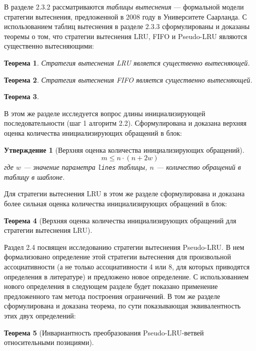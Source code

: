 \documentclass[14pt,autoref,href
,facsimile
]{disser}
\newtheorem{utv}{Утверждение}
\newtheorem{theorem}{Теорема}
\newcommand{\LRU}{LRU\xspace}
\newcommand{\PseudoLRU}{Pseudo-LRU\xspace}
\begin{document}
В разделе 2.3.2 рассматриваются \emph{таблицы вытеснения} --- формальной модели стратегии вытеснения, предложенной в 2008 году в Университете Саарланда. С использованием таблиц вытеснения в разделе 2.3.3 сформулированы и доказаны теоремы о том, что стратегии вытеснения LRU, FIFO и Pseudo-LRU являются существенно вытесняющими:
\begin{theorem}\label{thm:LRU_essential}
Стратегия вытеснения LRU является существенно вытесняющей.
\end{theorem}

\begin{theorem}
  Стратегия вытеснения FIFO является существенно вытесняющей.
\end{theorem}

\begin{theorem}\label{thm:PseudoLRU_essential} \PseudoLRUEssential \end{theorem}

В этом же разделе исследуется вопрос длины инициализирующей последовательности (шаг 1 алгоритм 2.2). Сформулирована и доказана верхняя оценка количества инициализирующих обращений в блок:
\begin{utv}[Верхняя оценка количества инициализирующих обращений]
$$m \leqslant n \cdot (n + 2w)$$ где $w$ --- значение параметра \texttt{lines} таблицы, $n$ --- количество обращений в таблицу в шаблоне.
\end{utv}

Для стратегии вытеснения LRU в этом же разделе сформулирована и доказана более сильная оценка количества инициализирующих обращений в блок:
\begin{theorem}[Верхняя оценка количества инициализирующих обращений для
стратегии вытеснения \LRU]\label{thm_mirror_lenth_lru} \UpperBoundLRUMirror
\end{theorem}

Раздел 2.4 посвящен исследованию стратегии вытеснения Pseudo-LRU. В нем формализовано определение этой стратегии вытеснения для произвольной ассоциативности (а не только ассоциативности 4 или 8, для которых приводятся определения в литературе) и предложено новое определение. С использованием нового определения в следующем разделе будет показано применение предложенного там метода построения ограничений. В том же разделе сформулирована и доказана теорема, по сути показывающая эквивалентность этих двух определений:
\begin{theorem}[Инвариантность преобразования \PseudoLRU-ветвей относительными
позициями]\label{thm_pseudoLRU_invariant} \PseudoLRUInvariant
\end{theorem}
\end{document}

